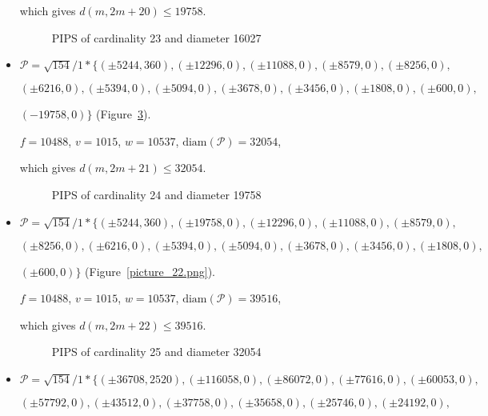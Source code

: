 \documentclass[12pt]{article}
\theoremstyle{theorem}
\theoremstyle{dfn}
\theoremstyle{remark}
\begin{document}
\begin{itemize}
which gives $d(m, 2m + 20) \leq 19758$.


\begin{figure}[h!]
\parbox{0.85\linewidth}{\caption{PIPS of cardinality 23 and diameter 16027}
\label{picture_19.png}}
\end{figure}


\item
$\mathcal{P}=\sqrt{154}/{1} * \{ (\pm 5244, 360),
(\pm 12296 , 0),
(\pm 11088 , 0),
(\pm 8579 , 0),
(\pm 8256 , 0),
$

$
(\pm 6216 , 0),
(\pm 5394 , 0),
(\pm 5094 , 0),
(\pm 3678 , 0),
(\pm 3456 , 0),
(\pm 1808 , 0),
(\pm 600 , 0),
$

$
(-19758 , 0)\}
$
(Figure~\ref{picture_21.png}).

$f = 10488$, $v = 1015$, $w = 10537$, $\operatorname{diam(\mathcal{P})} = 32054$,

which gives $d(m, 2m + 21) \leq 32054$.


\begin{figure}[h!]
\parbox{0.85\linewidth}{\caption{PIPS of cardinality 24 and diameter 19758}
\label{picture_20.png}}
\end{figure}


\item
$\mathcal{P}=\sqrt{154}/{1} * \{ (\pm 5244, 360),
(\pm 19758 , 0),
(\pm 12296 , 0),
(\pm 11088 , 0),
(\pm 8579 , 0),
$

$
(\pm 8256 , 0),
(\pm 6216 , 0),
(\pm 5394 , 0),
(\pm 5094 , 0),
(\pm 3678 , 0),
(\pm 3456 , 0),
(\pm 1808 , 0),
$

$
(\pm 600 , 0)\}
$
(Figure~\ref{picture_22.png}).

$f = 10488$, $v = 1015$, $w = 10537$, $\operatorname{diam(\mathcal{P})} = 39516$,

which gives $d(m, 2m + 22) \leq 39516$.

\begin{figure}[h!]
\parbox{1\linewidth}{\caption{PIPS of cardinality 25 and diameter 32054}
\label{picture_21.png}}
\end{figure}


\item
$\mathcal{P}=\sqrt{154}/{1} * \{ (\pm 36708, 2520),
(\pm 116058 , 0),
(\pm 86072 , 0),
(\pm 77616 , 0),
(\pm 60053 , 0),
$

$
(\pm 57792 , 0),
(\pm 43512 , 0),
(\pm 37758 , 0),
(\pm 35658 , 0),
(\pm 25746 , 0),
(\pm 24192 , 0),
$


\end{itemize}
\end{document}
